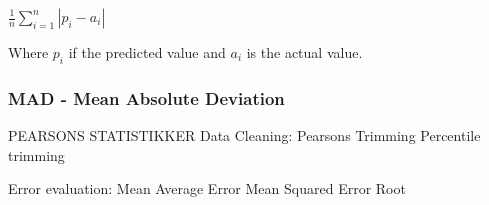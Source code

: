 $ \frac{1}{n}\sum_{i=1}^{n}|p_i-a_i| $

 Where $p_i$ if the predicted value and $a_i$ is the actual value.

\subsubsection{MAD - Mean Absolute Deviation}


PEARSONS
STATISTIKKER
	Data Cleaning:
		Pearsons
		Trimming
		Percentile trimming

	Error evaluation:
		Mean Average Error
		Mean Squared Error
		Root 
